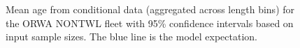 \documentclass[
]{scrartcl}
\begin{document}
\begin{figure}


\caption{\label{fig-mean-age-5}Mean age from conditional data
(aggregated across length bins) for the ORWA NONTWL fleet with 95\%
confidence intervals based on input sample sizes. The blue line is the
model expectation.}

\end{figure}%
\end{document}
